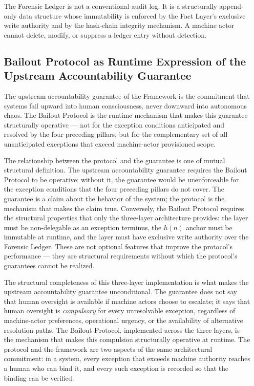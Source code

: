 The Forensic Ledger is not a conventional audit log. It is a structurally append-only data structure whose immutability is enforced by the Fact Layer's exclusive write authority and by the hash-chain integrity mechanism. A machine actor cannot delete, modify, or suppress a ledger entry without detection.

\subsection{Bailout Protocol as Runtime Expression of the Upstream Accountability Guarantee}\label{sec:runtime-expression}

The upstream accountability guarantee of the \bxthree{} Framework is the commitment that \bxthree{} systems fail upward into human consciousness, never downward into autonomous chaos. The Bailout Protocol is the runtime mechanism that makes this guarantee structurally operative --- not for the exception conditions anticipated and resolved by the four preceding pillars, but for the complementary set of all unanticipated exceptions that exceed machine-actor provisioned scope.

The relationship between the protocol and the guarantee is one of mutual structural definition. The upstream accountability guarantee requires the Bailout Protocol to be operative: without it, the guarantee would be unenforceable for the exception conditions that the four preceding pillars do not cover. The guarantee is a claim about the behavior of the system; the protocol is the mechanism that makes the claim true. Conversely, the Bailout Protocol requires the structural properties that only the \bxthree{} three-layer architecture provides: the \purpose{} layer must be non-delegable as an exception terminus, the $h(n)$ anchor must be immutable at runtime, and the \fact{} layer must have exclusive write authority over the Forensic Ledger. These are not optional features that improve the protocol's performance --- they are structural requirements without which the protocol's guarantees cannot be realized.

The structural completeness of this three-layer implementation is what makes the upstream accountability guarantee unconditional. The guarantee does not say that human oversight is available if machine actors choose to escalate; it says that human oversight is \emph{compulsory} for every unresolvable exception, regardless of machine-actor preferences, operational urgency, or the availability of alternative resolution paths. The Bailout Protocol, implemented across the three \bxthree{} layers, is the mechanism that makes this compulsion structurally operative at runtime. The protocol and the framework are two aspects of the same architectural commitment: in a \bxthree{} system, every exception that exceeds machine authority reaches a human who can bind it, and every such exception is recorded so that the binding can be verified.

